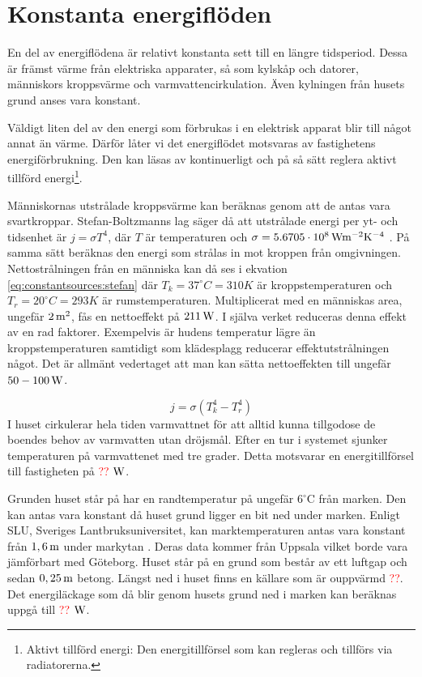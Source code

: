 \section{Konstanta energiflöden}

En del av energiflödena är relativt konstanta sett till en längre tidsperiod. Dessa är främst värme från elektriska apparater, så som kylskåp och datorer, människors kroppsvärme och varmvattencirkulation. Även kylningen från husets grund anses vara konstant.

Väldigt liten del av den energi som förbrukas i en elektrisk apparat blir till något annat än värme. Därför låter vi det energiflödet motsvaras av fastighetens energiförbrukning. Den kan läsas av kontinuerligt och på så sätt reglera aktivt tillförd energi\footnote{Aktivt tillförd energi: Den energitillförsel som kan regleras och tillförs via radiatorerna.}.

Människornas utstrålade kroppsvärme kan beräknas genom att de antas vara svartkroppar. Stefan-Boltzmanns lag säger då att utstrålade energi per yt- och tidsenhet är $j=\sigma T^4$, där $T$ är temperaturen och $\sigma=\unit[5.6705\cdot 10^8]{Wm^{-2}K^{-4}}$ \cite{physicshandbook}. På samma sätt beräknas den energi som strålas in mot kroppen från omgivningen. Nettostrålningen från en människa kan då ses i ekvation \eqref{eq:constantsources:stefan} där $T_k=37^{\circ}C=310K$ är kroppstemperaturen och $T_r=20^{\circ}C=293K$ är rumstemperaturen. Multiplicerat med en människas area, ungefär $\unit[2]{m^2}$, fås en nettoeffekt på $\unit[211]{W}$. I själva verket reduceras denna effekt av en rad faktorer. Exempelvis är hudens temperatur lägre än kroppstemperaturen samtidigt som klädesplagg reducerar effektutstrålningen något. Det är allmänt vedertaget att man kan sätta nettoeffekten till ungefär $\unit[50-100]{W}$.

\begin{equation}
\label{eq:constantsources:stefan}
j=\sigma \left( T_k^4 - T_r^4 \right)
\end{equation}
\noindent
I huset cirkulerar hela tiden varmvattnet för att alltid kunna tillgodose de boendes behov av varmvatten utan dröjsmål. Efter en tur i systemet sjunker temperaturen på varmvattenet med tre grader. Detta motsvarar en energitillförsel till fastigheten på \textcolor{red}{??} $\unit[]{W}$.

Grunden huset står på har en randtemperatur på ungefär $6^{\circ}\mbox{C}$ från marken. Den kan antas vara konstant då huset grund ligger en bit ned under marken. Enligt SLU, Sveriges Lantbruksuniversitet, kan marktemperaturen antas vara konstant från $\unit[1,6]{m}$ under markytan \cite{SLU}. Deras data kommer från Uppsala vilket borde vara jämförbart med Göteborg. Huset står på en grund som består av ett luftgap och sedan $\unit[0,25]{m}$ betong. Längst ned i huset finns en källare som är ouppvärmd \textcolor{red}{??}. Det energiläckage som då blir genom husets grund ned i marken kan beräknas uppgå till \textcolor{red}{??} $\unit[]{W}$.
